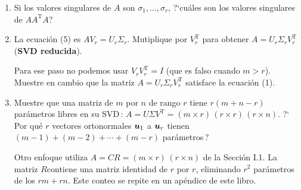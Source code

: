 \documentclass[12pt,a4paper]{article}
\newcommand\1{\mbox{\,\vrule height-0.8pt depth1.0pt width2pc\,}}
\newcommand\2{\mbox{\,\vrule height-0.8pt depth1.0pt width1pc\,}}
\DeclareRobustCommand\transp{^{\mathrm{T}}}
\newcommand{\bu}{\hbox{\boldmath$u$}}
\begin{document}
\begin{enumerate}

\item Si los valores singulares de $A$ son $\sigma_1,\dots,\sigma_r$, ?`cuáles son los valores singulares de $AA\transp A$?


%


\item La ecuaci\'on (5) es $AV_r=U_r\Sigma_r$. Mutiplique por $V\transp_r$  para obtener $A=U_r\Sigma_r V_r\transp$ (\textbf{SVD reducida}).

\vspace{5pt}
Para ese paso no podemos usar $V_rV_r\transp=I$ (que es falso cuando $m>r$). Muestre en cambio que la matriz $A=U_r\Sigma_r V_r\transp$ satisface la ecuaci\'on (1).
%


\item Muestre que una matriz de $m$ por $n$ de rango $r$ tiene $r(m+n-r)$ par\'ametros libres en su SVD\,: $A=U\Sigma V\transp=(m\times r)\,(r\times r)\,(r\times n)$. ?`\,Por qu\'e  $r$ vectores ortonormales $\bu_1$ a $\bu_r$ tienen $(m-1)+(m-2)+\cdots+(m-r)$ par\'ametros\,?

Otro enfoque utiliza $A=CR=(m\times r)\,(r\times n)$ de la Secci\'on I.1. La matriz $R$\linebreak contiene una matriz identidad de $r$ por $r$, eliminando   $r^2$ par\'ametros de los  $rm+rn$. Este conteo se repite en un ap\'endice de este libro.


\end{enumerate}
\end{document}
